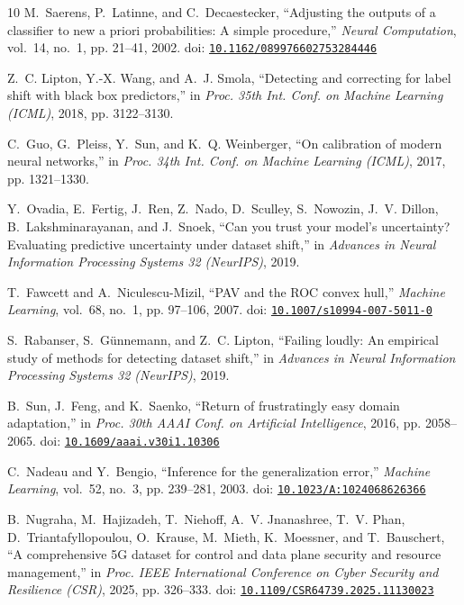 \begin{thebibliography}{10}
M.~Saerens, P.~Latinne, and C.~Decaestecker, ``Adjusting the outputs of a
  classifier to new a priori probabilities: A simple procedure,'' \emph{Neural
  Computation}, vol.~14, no.~1, pp. 21--41, 2002. doi:
  \href{https://doi.org/10.1162/089976602753284446}{\nolinkurl{10.1162/089976602753284446}}

Z.~C. Lipton, Y.-X. Wang, and A.~J. Smola, ``Detecting and correcting for label
  shift with black box predictors,'' in \emph{Proc. 35th Int. Conf. on Machine
  Learning (ICML)}, 2018, pp. 3122--3130.

C.~Guo, G.~Pleiss, Y.~Sun, and K.~Q. Weinberger, ``On calibration of modern
  neural networks,'' in \emph{Proc. 34th Int. Conf. on Machine Learning
  (ICML)}, 2017, pp. 1321--1330.

Y.~Ovadia, E.~Fertig, J.~Ren, Z.~Nado, D.~Sculley, S.~Nowozin, J.~V. Dillon,
  B.~Lakshminarayanan, and J.~Snoek, ``Can you trust your model's uncertainty?
  {E}valuating predictive uncertainty under dataset shift,'' in \emph{Advances
  in Neural Information Processing Systems 32 (NeurIPS)}, 2019.

T.~Fawcett and A.~Niculescu-Mizil, ``{PAV} and the {ROC} convex hull,''
  \emph{Machine Learning}, vol.~68, no.~1, pp. 97--106, 2007. doi:
  \href{https://doi.org/10.1007/s10994-007-5011-0}{\nolinkurl{10.1007/s10994-007-5011-0}}

S.~Rabanser, S.~G{\"u}nnemann, and Z.~C. Lipton, ``Failing loudly: An empirical
  study of methods for detecting dataset shift,'' in \emph{Advances in Neural
  Information Processing Systems 32 (NeurIPS)}, 2019.

B.~Sun, J.~Feng, and K.~Saenko, ``Return of frustratingly easy domain
  adaptation,'' in \emph{Proc. 30th AAAI Conf. on Artificial Intelligence},
  2016, pp. 2058--2065. doi:
  \href{https://doi.org/10.1609/aaai.v30i1.10306}{\nolinkurl{10.1609/aaai.v30i1.10306}}

C.~Nadeau and Y.~Bengio, ``Inference for the generalization error,''
  \emph{Machine Learning}, vol.~52, no.~3, pp. 239--281, 2003. doi:
  \href{https://doi.org/10.1023/A:1024068626366}{\nolinkurl{10.1023/A:1024068626366}}

B.~Nugraha, M.~Hajizadeh, T.~Niehoff, A.~V. Jnanashree, T.~V. Phan,
  D.~Triantafyllopoulou, O.~Krause, M.~Mieth, K.~Moessner, and T.~Bauschert,
  ``A comprehensive {5G} dataset for control and data plane security and
  resource management,'' in \emph{Proc. IEEE International Conference on Cyber
  Security and Resilience (CSR)}, 2025, pp. 326--333. doi:
  \href{https://doi.org/10.1109/CSR64739.2025.11130023}{\nolinkurl{10.1109/CSR64739.2025.11130023}}


\end{thebibliography}
